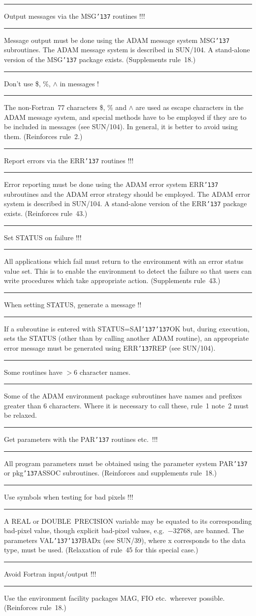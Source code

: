 \documentclass[twoside,11pt]{article}
\newcounter{sruleno}
\newcommand{\srule}[1]{
    \addtocounter{sruleno}{1}
    \goodbreak
    \rule[0.5ex]{\textwidth}{0.3mm}
    {\Large #1 \hfill {\thesruleno}}
    \rule[0.5ex]{\textwidth}{0.1mm}
}
\newcommand{\srule}[1]{
       \addtocounter{sruleno}{1}
       \begin{rawhtml} <HR> \end{rawhtml}
       {\Large \thesruleno}~~~~{\Large #1}
       \begin{rawhtml} <HR> \end{rawhtml}
       \end{tabular}
  }
\renewcommand{\_}{{\tt\char'137}}
\begin{document}
\srule{Output messages via the MSG\_ routines !!!}
Message output must be done using the ADAM message system MSG\_ subroutines.
The ADAM message system is described in SUN/104.  A stand-alone
version of the MSG\_ package exists.
(Supplements rule~18.)

\srule{Don't use \$, \%, $\wedge$ in messages !}
The non-Fortran~77 characters \$, \% and $\wedge$ are
used as escape characters in the ADAM message system, and
special methods have to be employed if they are to be included
in messages (see SUN/104).  In general, it is better to
avoid using them.
(Reinforces rule~2.)

\srule{Report errors via the ERR\_ routines !!!}
Error reporting must be done using the ADAM error system ERR\_ subroutines
and the ADAM error strategy should be employed.
The ADAM error system is described in SUN/104.   A stand-alone
version of the ERR\_ package exists.
(Reinforces rule~43.)

\srule{Set STATUS on failure !!!}
All applications which fail must return to the
environment with an error status value set.
This is to enable the environment to detect the failure so that users can
write procedures which take appropriate action.
(Supplements rule~43.)

\srule{When setting STATUS, generate a message !!}
If a subroutine is entered with STATUS=SAI\_\_OK
but, during execution,
sets the STATUS (other than by calling another ADAM routine),
an appropriate error message must be generated using ERR\_REP
(see SUN/104).

\srule{Some routines have $>6$ character names.}
Some of the ADAM environment package subroutines have names and prefixes
greater than 6 characters.
Where it is necessary to call these, rule~1 note~2 must be relaxed.

\srule{Get parameters with the PAR\_ routines etc.\ !!!}
All program parameters must be obtained using the parameter system PAR\_
or pkg\_ASSOC subroutines.
(Reinforces and supplements rule~18.)

\srule{Use symbols when testing for bad pixels !!!}
A REAL or DOUBLE~PRECISION variable may be equated to its corresponding
bad-pixel value, though explicit bad-pixel values, e.g.\ $-32768$, are banned.
The parameters VAL\_\_BADx
(see SUN/39), where x corresponds to the data type, must be
used.
(Relaxation of rule~45 for this special case.)

\srule{Avoid Fortran input/output !!!}
Use the environment facility packages MAG, FIO etc.\ wherever possible.
(Reinforces rule~18.)
\end{document}
